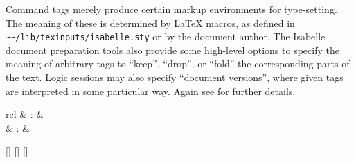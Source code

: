 \begin{isabellebody}
\begin{isamarkuptext}
  \medskip Command tags merely produce certain markup environments for
  type-setting.  The meaning of these is determined by {\LaTeX}
  macros, as defined in \verb|~~/lib/texinputs/isabelle.sty| or
  by the document author.  The Isabelle document preparation tools
  also provide some high-level options to specify the meaning of
  arbitrary tags to ``keep'', ``drop'', or ``fold'' the corresponding
  parts of the text.  Logic sessions may also specify ``document
  versions'', where given tags are interpreted in some particular way.
  Again see \cite{isabelle-sys} for further details.%
\end{isamarkuptext}%
\isamarkuptrue%
%
\isamarkuptrue%
%
\begin{isamarkuptext}%
\begin{matharray}{rcl}
    \hypertarget{command.display-drafts}{\hyperlink{command.display-drafts}{\mbox{}}} & : &  \\
    \hypertarget{command.print-drafts}{\hyperlink{command.print-drafts}{\mbox{}}} & : &  \\
  \end{matharray}

  \begin{railoutput}
\rail@bar
{}[]
[]
\rail@endbar
\rail@plus
{}[]
\rail@endplus
\rail@end
\end{railoutput}



\end{isamarkuptext}
\end{isabellebody}
